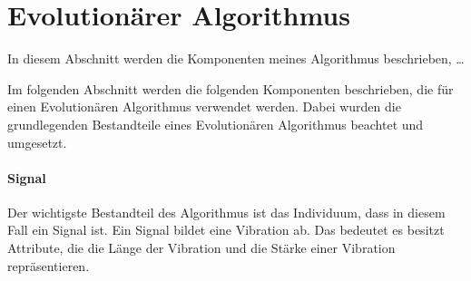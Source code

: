 

%



\section{Evolution{\"a}rer Algorithmus}

In diesem Abschnitt werden die Komponenten meines Algorithmus beschrieben, \dots

Im folgenden Abschnitt werden die folgenden Komponenten beschrieben, die f{\"u}r einen Evolution{\"a}ren Algorithmus verwendet werden. Dabei wurden die grundlegenden Bestandteile eines Evolution{\"a}ren Algorithmus beachtet und umgesetzt. 

\paragraph*{Signal}
Der wichtigste Bestandteil des Algorithmus ist das Individuum, dass in diesem Fall ein Signal ist. Ein Signal bildet eine Vibration ab. 
Das bedeutet es besitzt Attribute, die die L{\"a}nge der Vibration und die St{\"a}rke einer Vibration repr{\"a}sentieren.

